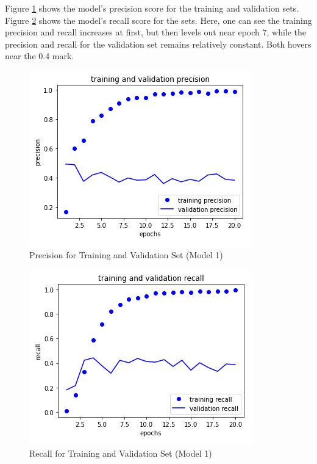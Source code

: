 \documentclass[11pt,a4paper]{article}
\begin{document}
Figure \ref{fig:plot_prec} shows the model's precision score for the training and validation sets. Figure \ref{fig:plot_rec} shows the model's recall score for the sets. Here, one can see the training precision and recall increases at first, but then levels out near epoch 7, while the precision and recall for the validation set remains relatively constant. Both hovers near the 0.4 mark.

\begin{figure}[t]
\includegraphics[scale=0.5]{plot_prec.png}
\centering
\caption{Precision for Training and Validation Set (Model 1)}
\label{fig:plot_prec}
\end{figure}

\begin{figure}[t]
\includegraphics[scale=0.5]{plot_rec.png}
\centering
\caption{Recall for Training and Validation Set (Model 1)}
\label{fig:plot_rec}
\end{figure}
\end{document}
